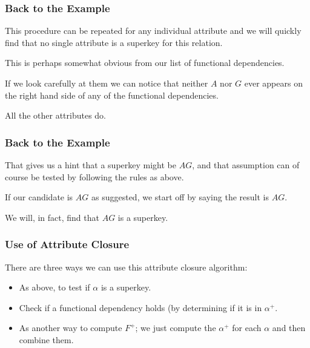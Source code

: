 \begin{frame}
\frametitle{Back to the Example}

This procedure can be repeated for any individual attribute and we will quickly find that no single attribute is a superkey for this relation. 

This is perhaps somewhat obvious from our list of functional dependencies. 

If we look carefully at them we can notice that neither $A$ nor $G$ ever appears on the right hand side of any of the functional dependencies.

All the other attributes do.


\end{frame}



\begin{frame}
\frametitle{Back to the Example}

That gives us a hint that a superkey might be $AG$, and that assumption can of course be tested by following the rules as above.

If our candidate is $AG$ as suggested, we start off by saying the result is $AG$. 

We will, in fact, find that $AG$ is a superkey.

\end{frame}




\begin{frame}
\frametitle{Use of Attribute Closure}

There are three ways we can use this attribute closure algorithm:
\begin{itemize}
	\item As above, to test if $\alpha$ is a superkey.
	\item Check if a functional dependency holds (by determining if it is in $\alpha^{+}$.
	\item As another way to compute $F^{+}$; we just compute the $\alpha^{+}$ for each $\alpha$ and then combine them. 
\end{itemize}

\end{frame}

